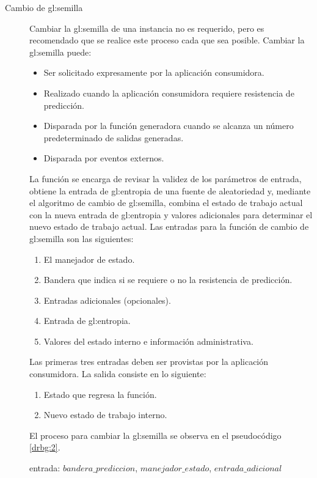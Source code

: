 \begin{description}
  \item [Cambio de \gls{gl:semilla}] Cambiar la \gls{gl:semilla} de una
    instancia no es requerido, pero es recomendado que se realice este proceso
    cada que sea posible. Cambiar la \gls{gl:semilla} puede:
    \begin{itemize}
      \item Ser solicitado expresamente por la aplicación consumidora.
      \item Realizado cuando la aplicación consumidora requiere resistencia de
        predicción.
      \item Disparada por la función generadora cuando se alcanza un número
        predeterminado de salidas generadas.
      \item Disparada por eventos externos.
    \end{itemize}
    La función se encarga de revisar la validez de los parámetros de entrada,
    obtiene la entrada de \gls{gl:entropia} de una fuente de aleatoriedad y,
    mediante el algoritmo de cambio de \gls{gl:semilla}, combina el estado de
    trabajo actual con la nueva entrada de \gls{gl:entropia} y valores
    adicionales para determinar el nuevo estado de trabajo actual. Las entradas
    para la función de cambio de \gls{gl:semilla} son las siguientes:
    \begin{enumerate}
      \item El manejador de estado.
      \item Bandera que indica si se requiere o no la resistencia de predicción.
      \item Entradas adicionales (opcionales).
      \item Entrada de \gls{gl:entropia}.
      \item Valores del estado interno e información administrativa.
    \end{enumerate}
    Las primeras tres entradas deben ser provistas por la aplicación
    consumidora. La salida consiste en lo siguiente:
    \begin{enumerate}
      \item Estado que regresa la función.
      \item Nuevo estado de trabajo interno.
    \end{enumerate}
    El proceso para cambiar la \gls{gl:semilla} se observa en el pseudocódigo
    \ref{drbg:2}.
\begin{pseudocodigo}[caption={DRBG, cambio de semilla.}, label={drbg:2}]
  entrada:  $bandera\_prediccion$, $manejador\_estado$, $entrada\_adicional$

\end{pseudocodigo}
\end{description}

